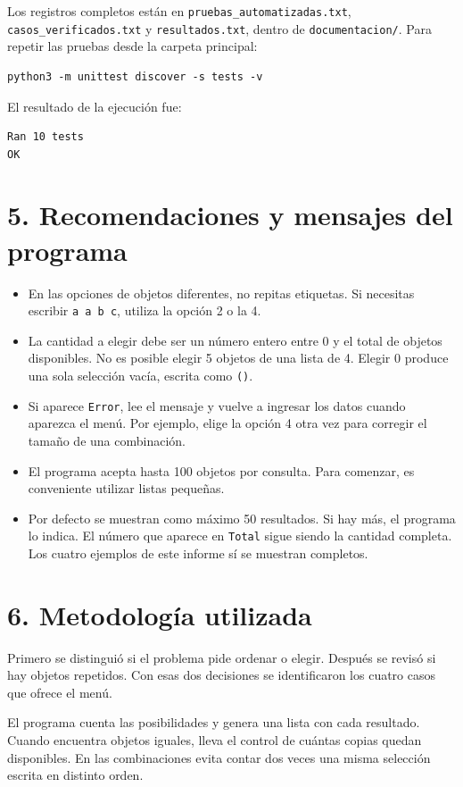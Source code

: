 \documentclass[11pt,a4paper]{article}
\begin{document}
Los registros completos están en \texttt{pruebas\_automatizadas.txt},
\texttt{casos\_verificados.txt} y \texttt{resultados.txt}, dentro de
\texttt{documentacion/}. Para repetir las pruebas desde la carpeta principal:
\begin{verbatim}
python3 -m unittest discover -s tests -v
\end{verbatim}
El resultado de la ejecución fue:
\begin{verbatim}
Ran 10 tests
OK
\end{verbatim}

\newpage
\section*{5. Recomendaciones y mensajes del programa}
\begin{itemize}
\item En las opciones de objetos diferentes, no repitas etiquetas.
Si necesitas escribir \texttt{a a b c}, utiliza la opción 2 o la 4.
\item La cantidad a elegir debe ser un número entero entre 0 y el total
de objetos disponibles. No es posible elegir 5 objetos de una lista de 4.
Elegir 0 produce una sola selección vacía, escrita como \texttt{()}.
\item Si aparece \texttt{Error}, lee el mensaje y vuelve a ingresar los
datos cuando aparezca el menú. Por ejemplo, elige la opción 4 otra vez
para corregir el tamaño de una combinación.
\item El programa acepta hasta 100 objetos por consulta. Para comenzar,
es conveniente utilizar listas pequeñas.
\item Por defecto se muestran como máximo 50 resultados. Si hay más, el
programa lo indica. El número que aparece en \texttt{Total} sigue siendo
la cantidad completa. Los cuatro ejemplos de este informe sí se muestran
completos.
\end{itemize}

\section*{6. Metodología utilizada}
Primero se distinguió si el problema pide ordenar o elegir. Después se
revisó si hay objetos repetidos. Con esas dos decisiones se identificaron
los cuatro casos que ofrece el menú.

El programa cuenta las posibilidades y genera una lista con cada resultado.
Cuando encuentra objetos iguales, lleva el control de cuántas copias quedan
disponibles. En las combinaciones evita contar dos veces una misma selección
escrita en distinto orden.
\end{document}
